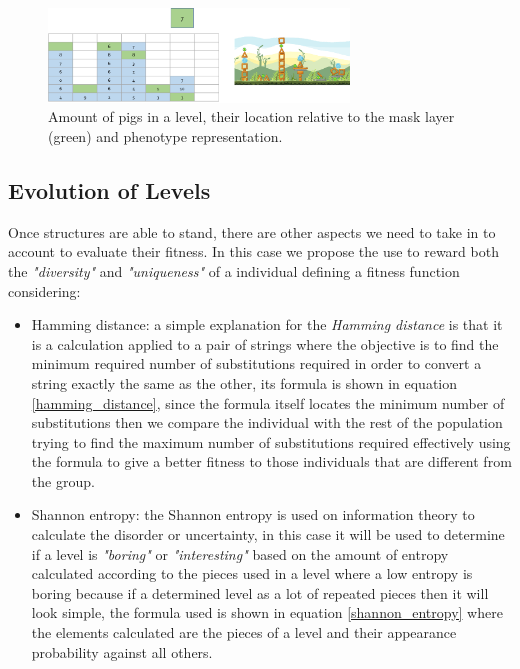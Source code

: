 \documentclass[conference]{IEEEtran}
\begin{document}
    \begin{figure}[htbp]
        \centerline{\includegraphics[width=80mm]{Images/enemy_layer.png}}
        \caption{Amount of pigs in a level, their location relative to the mask layer
         (green) and phenotype representation.}
        \label{enemy_layer}
    \end{figure}
    
    \subsection{Evolution of Levels} 

    Once structures are able to stand, there are other aspects we need to take
    in to account to evaluate their fitness. In this case we propose the use to
    reward both the \textit{"diversity"} and \textit{"uniqueness"} of a
    individual defining a fitness function considering:
    
    \begin{itemize}
        \item Hamming distance: a simple explanation for the \textit{Hamming
        distance} is that it is a calculation applied to a pair of strings where the
        objective is to find the minimum required number of substitutions required in
        order to convert a string exactly the same as the other, its formula is
        shown in equation \ref{hamming_distance}, since the formula itself locates
        the minimum number of substitutions then we compare the individual
        with the rest of the population trying to find the maximum number of
        substitutions required effectively using the formula to give a better fitness
        to those individuals that are different from the group.
        \item Shannon entropy: the Shannon entropy is used on information theory to
        calculate the disorder or uncertainty, in this case it will be used to
        determine if a level is \textit{"boring"} or \textit{"interesting"} based on
        the amount of entropy calculated according to the pieces used in a level
        where a low entropy is boring because if a determined level as a lot of
        repeated pieces then it will look simple, the formula used is shown in
        equation \ref{shannon_entropy} where the elements calculated are the pieces
        of a level and their appearance probability against all others.
    \end{itemize}
    
\end{document}
